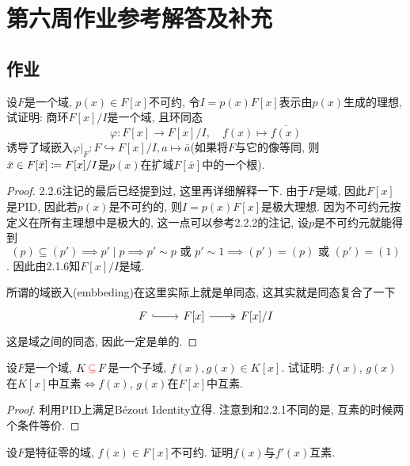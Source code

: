\documentclass{../solutions-cn}
\begin{document}
\section*{第六周作业参考解答及补充}

\subsection*{作业}

\begin{exercise}[习题2.3.2]
    设$F$是一个域, $p(x) \in F[x]$不可约, 令$I = p(x)F[x]$表示由$p(x)$生成的理想, 试证明: 商环$F[x]/I$是一个域, 且环同态
    \[
        \varphi:F[x] \to F[x]/I,\quad f(x) \mapsto \overline{f(x)}
    \]
    诱导了域嵌入$\varphi|_F: F \hookrightarrow F[x]/I, a \mapsto \bar{a}$(如果将$F$与它的像等同, 则$\bar{x} \in F[\bar{x}] \mathrel{\coloneqq} F[x]/I$是$p(x)$在扩域$F[\bar{x}]$中的一个根).
\end{exercise}

\begin{proof}
    2.2.6注记的最后已经提到过, 这里再详细解释一下. 由于$F$是域, 因此$F[x]$是PID, 因此若$p(x)$是不可约的, 则$I = p(x)F[x]$是极大理想. 因为不可约元按定义在所有主理想中是极大的, 这一点可以参考2.2.2的注记, 设$p$是不可约元就能得到
    \[
        (p) \subseteq (p') \implies p' \mid p \implies p' \sim p \text{ 或 } p' \sim 1 \implies (p') = (p) \text{ 或 } (p') = (1)
    \]. 因此由2.1.6知$F[x]/I$是域.
    
    所谓的域嵌入(embbeding)在这里实际上就是单同态, 这其实就是同态复合了一下
    \[
        \begin{tikzcd}
            F \arrow[r, hook] & {F[x]} \arrow[r, two heads] & {F[x]/I}
        \end{tikzcd}
    \]
    这是域之间的同态, 因此一定是单的.
\end{proof}

\begin{exercise}[习题2.3.3]
    设$F$是一个域, $K \,\textcolor{red}{\subseteq}\, F$是一个子域, $f(x), g(x) \in K[x]$. 试证明: $f(x)$, $g(x)$在$K[x]$中互素$\Leftrightarrow f(x)$, $g(x)$在$F[x]$中互素.
\end{exercise}

\begin{proof}
    利用PID上满足Bézout Identity立得. 注意到和2.2.1不同的是, 互素的时候两个条件等价.
\end{proof}

\begin{exercise}[习题2.3.4]
    设$F$是特征零的域, $f(x) \in F[x]$不可约. 证明$f(x)$与$f'(x)$互素.
\end{exercise}
\end{document}
